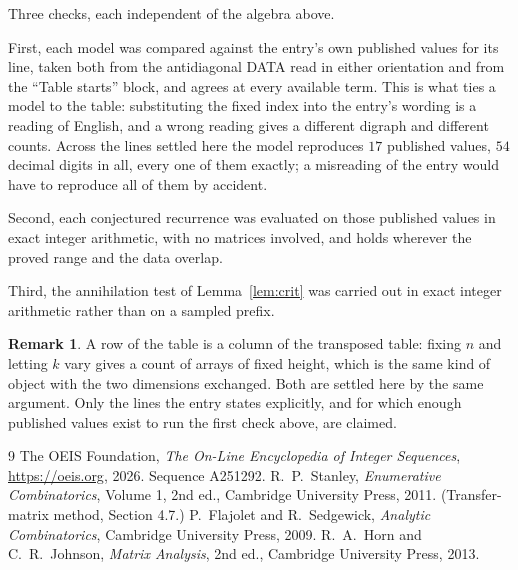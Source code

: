 \documentclass[11pt,a4paper]{article}
\theoremstyle{plain}
\theoremstyle{definition}
\newtheorem{remark}[theorem]{Remark}
\begin{document}
Three checks, each independent of the algebra above.

First, each model was compared against the entry's own published values for its line, taken
both from the antidiagonal DATA read in either orientation and from the ``Table starts''
block, and agrees at every available term. This is what ties a model to the table:
substituting the fixed index into the entry's wording is a reading of English, and a wrong
reading gives a different digraph and different counts. Across the lines settled here the
model reproduces $17$ published values, $54$ decimal digits in all, every one of
them exactly; a misreading of the entry would have to reproduce all of them by accident.

Second, each conjectured recurrence was evaluated on those published values in exact
integer arithmetic, with no matrices involved, and holds wherever the proved range and the
data overlap.

Third, the annihilation test of Lemma~\ref{lem:crit} was carried out in exact integer
arithmetic rather than on a sampled prefix.

\begin{remark}
A row of the table is a column of the transposed table: fixing $n$ and letting $k$ vary gives a
count of arrays of fixed height, which is the same kind of object with the two dimensions
exchanged. Both are settled here by the same argument. Only the lines the entry states
explicitly, and for which enough published values exist to run the first check above, are
claimed.
\end{remark}

\begin{thebibliography}{9}
 The OEIS Foundation, \emph{The On-Line Encyclopedia of Integer
Sequences}, \url{https://oeis.org}, 2026. Sequence A251292.
 R.~P.~Stanley, \emph{Enumerative Combinatorics}, Volume 1, 2nd ed.,
Cambridge University Press, 2011. (Transfer-matrix method, Section 4.7.)
 P.~Flajolet and R.~Sedgewick, \emph{Analytic Combinatorics}, Cambridge
University Press, 2009.
 R.~A.~Horn and C.~R.~Johnson, \emph{Matrix Analysis}, 2nd ed., Cambridge
University Press, 2013.
\end{thebibliography}
\end{document}
